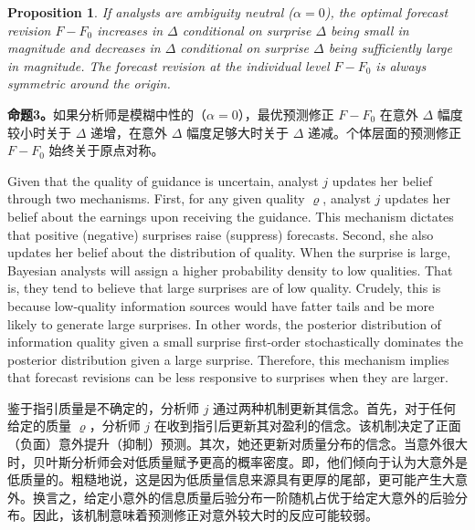 \documentclass[12pt,a4paper]{article}
\newenvironment{original}
  {\par\medskip\noindent\ignorespaces}
  {\par\medskip}
\newenvironment{translation}
  {\par\noindent{\color{transblue}\ignorespaces}}
  {\par\bigskip}
\newtheorem{proposition}[theorem]{Proposition}
\begin{document}
\begin{proposition}
If analysts are ambiguity neutral ($\alpha = 0$), the optimal forecast revision $F - F_0$ increases in $\Delta$ conditional on surprise $\Delta$ being small in magnitude and decreases in $\Delta$ conditional on surprise $\Delta$ being sufficiently large in magnitude. The forecast revision at the individual level $F - F_0$ is always symmetric around the origin.
\end{proposition}
\begin{translation}
\textbf{命题3。}如果分析师是模糊中性的（$\alpha = 0$），最优预测修正 $F - F_0$ 在意外 $\Delta$ 幅度较小时关于 $\Delta$ 递增，在意外 $\Delta$ 幅度足够大时关于 $\Delta$ 递减。个体层面的预测修正 $F - F_0$ 始终关于原点对称。
\end{translation}

\begin{original}
Given that the quality of guidance is uncertain, analyst $j$ updates her belief through two mechanisms. First, for any given quality $\varrho$, analyst $j$ updates her belief about the earnings upon receiving the guidance. This mechanism dictates that positive (negative) surprises raise (suppress) forecasts. Second, she also updates her belief about the distribution of quality. When the surprise is large, Bayesian analysts will assign a higher probability density to low qualities. That is, they tend to believe that large surprises are of low quality. Crudely, this is because low-quality information sources would have fatter tails and be more likely to generate large surprises. In other words, the posterior distribution of information quality given a small surprise first-order stochastically dominates the posterior distribution given a large surprise. Therefore, this mechanism implies that forecast revisions can be less responsive to surprises when they are larger.
\end{original}
\begin{translation}
鉴于指引质量是不确定的，分析师 $j$ 通过两种机制更新其信念。首先，对于任何给定的质量 $\varrho$，分析师 $j$ 在收到指引后更新其对盈利的信念。该机制决定了正面（负面）意外提升（抑制）预测。其次，她还更新对质量分布的信念。当意外很大时，贝叶斯分析师会对低质量赋予更高的概率密度。即，他们倾向于认为大意外是低质量的。粗糙地说，这是因为低质量信息来源具有更厚的尾部，更可能产生大意外。换言之，给定小意外的信息质量后验分布一阶随机占优于给定大意外的后验分布。因此，该机制意味着预测修正对意外较大时的反应可能较弱。
\end{translation}
\end{document}
